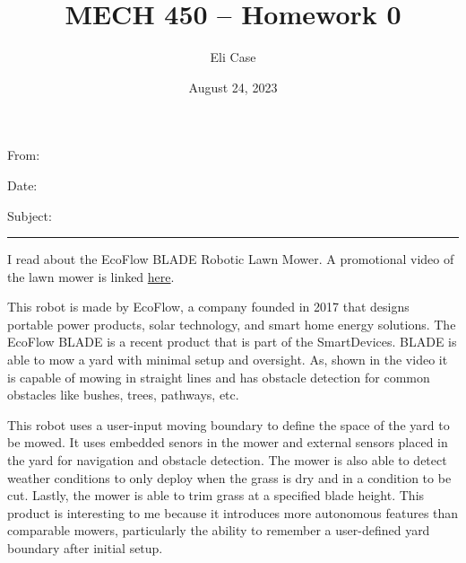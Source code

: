 \documentclass[11pt]{article}
\author{Eli Case}
\title{MECH 450 -- Homework 0}
\date{August 24, 2023}
\begin{document}
\flushleft
\thispagestyle{plain}

From: \@author

Date: \@date

Subject: \@title

\makeatother
\medskip
\hrule
\medskip

   I read about the EcoFlow BLADE Robotic Lawn Mower. A promotional video of the lawn mower is linked \href{https://www.youtube.com/watch?v=vbIWNvkncE8}{here}.
   
   \vspace{10px}

   This robot is made by EcoFlow, a company founded in 2017 that designs portable power products, solar technology, and smart home energy solutions. The EcoFlow BLADE is a recent product that is part of the SmartDevices. BLADE is able to mow a yard with minimal setup and oversight. As, shown in the video it is capable of mowing in straight lines and has obstacle detection for common obstacles like bushes, trees, pathways, etc. 
   
   \vspace{10px}

   This robot uses a user-input moving boundary to define the space of the yard to be mowed. It uses embedded senors in the mower and external sensors placed in the yard for navigation and obstacle detection. The mower is also able to detect weather conditions to only deploy when the grass is dry and in a condition to be cut. Lastly, the mower is able to trim grass at a specified blade height. This product is interesting to me because it introduces more autonomous features than comparable mowers, particularly the ability to remember a user-defined yard boundary after initial setup.
\end{document}

